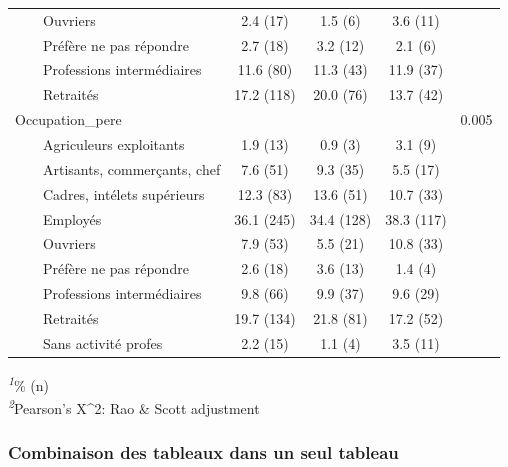 \documentclass[
]{article}
\begin{document}
\begin{table}[!t]
\begin{tabular*}{\linewidth}{@{\extracolsep{\fill}}lcccc}
    Ouvriers & 2.4 (17) & 1.5 (6) & 3.6 (11) &  \\ 
    Préfère ne pas répondre & 2.7 (18) & 3.2 (12) & 2.1 (6) &  \\ 
    Professions intermédiaires & 11.6 (80) & 11.3 (43) & 11.9 (37) &  \\ 
    Retraités & 17.2 (118) & 20.0 (76) & 13.7 (42) &  \\ 
Occupation\_pere &  &  &  & 0.005 \\ 
    Agriculeurs exploitants & 1.9 (13) & 0.9 (3) & 3.1 (9) &  \\ 
    Artisants, commerçants, chef & 7.6 (51) & 9.3 (35) & 5.5 (17) &  \\ 
    Cadres, intélets supérieurs & 12.3 (83) & 13.6 (51) & 10.7 (33) &  \\ 
    Employés & 36.1 (245) & 34.4 (128) & 38.3 (117) &  \\ 
    Ouvriers & 7.9 (53) & 5.5 (21) & 10.8 (33) &  \\ 
    Préfère ne pas répondre & 2.6 (18) & 3.6 (13) & 1.4 (4) &  \\ 
    Professions intermédiaires & 9.8 (66) & 9.9 (37) & 9.6 (29) &  \\ 
    Retraités & 19.7 (134) & 21.8 (81) & 17.2 (52) &  \\ 
    Sans activité profes & 2.2 (15) & 1.1 (4) & 3.5 (11) &  \\ 
\bottomrule
\end{tabular*}
\begin{minipage}{\linewidth}
\textsuperscript{\textit{1}}\% (n)\\
\textsuperscript{\textit{2}}Pearson's X\^{}2: Rao \& Scott adjustment\\
\end{minipage}
\end{table}

\vspace{1cm}

\hypertarget{combinaison-des-tableaux-dans-un-seul-tableau}{%
\subsubsection{Combinaison des tableaux dans un seul
tableau}\label{combinaison-des-tableaux-dans-un-seul-tableau}}
\end{document}
